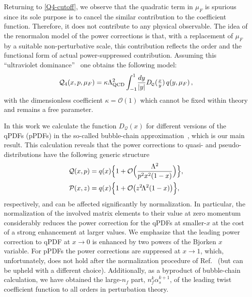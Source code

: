 \documentclass[aps,prd,twocolumn,a4paper,superscriptaddress,10pt,showpacs,notitlepage,floatfix]{revtex4-1}
\newcommand{\Qd}{\!\scriptscriptstyle \mathcal{Q}}
\newcommand{\cQ}{\mathcal{Q}}
\begin{document}
Returning to \eqref{Q4-cutoff}, we observe that the quadratic term in $\mu_F$ is spurious since its sole purpose is to cancel the similar contribution to the coefficient function. Therefore, it does not contribute to any physical observable. The idea of the renormalon model of the power corrections \cite{Beneke:1995pq,Dokshitzer:1995qm,Dasgupta:1996hh,Dasgupta:1996ki,Beneke:1997sr,Braun:2004bu} is that, with a replacement of $\mu_F$ by a suitable non-perturbative scale, this contribution reflects the order and the functional form of actual power-suppressed contribution. Assuming this ``ultraviolet dominance''~\cite{Braun:1995tp,Beneke:1998ui,Beneke:2000kc} one obtains the following  model:
\begin{equation}
 \mathcal{Q}_4(x,p,\mu_F) = \kappa 
\Lambda_{\rm QCD}^2 \int_{-1}^1 \!\frac{dy}{|y|} D_{\Qd}(\tfrac{x}{y})\, q(y,\mu_F)\,,
\label{UV_Lambda_int}
\end{equation}
with the dimensionless coefficient $\kappa = \mathcal{O}(1)$ which cannot be fixed within theory and remains a free parameter.

In this work we calculate the function $D_{\Qd}(x)$ for different versions of the qPDFs (pPDFs) in the so-called bubble-chain approximation~\cite{Beneke:1998ui}, which is our main result. This calculation reveals that the power corrections to quasi- and pseudo-distributions have the
following generic structure
\begin{align}
 \cQ (x,p) &=  q(x) \Big\{1 + \mathcal{O}\Big( \frac{\Lambda^2}{p^2x^2(1-x)}\Big) \Big\},  
\notag\\
\mathcal{P}(x,z) &= q(x)\Big\{1 + \mathcal{O}\big( z^2\!\Lambda^2{(1-x)}\big)\Big\},
\end{align}
respectively, and can be affected significantly by normalization. In particular, the normalization of the involved matrix elements to their value at zero momentum considerably reduces the power correction for the qPDFs at smaller-$x$ at the cost of a strong enhancement at larger values. We emphasize that the leading power correction to qPDF at $x\to 0$  is enhanced by two powers of the Bjorken $x$ variable. For pPDFs the power corrections are suppresed at $x\to1$, which, unfortunately,  does not hold after the normalization procedure of Ref.~\cite{Orginos:2017kos} (but can be upheld with a different choice). Additionally, as a byproduct of bubble-chain calculation, we have obtained the large-$n_f$ part, $n^k_f \alpha_s^{k+1}$, of the
leading twist coefficient function to all orders in perturbation theory.   
\end{document}
